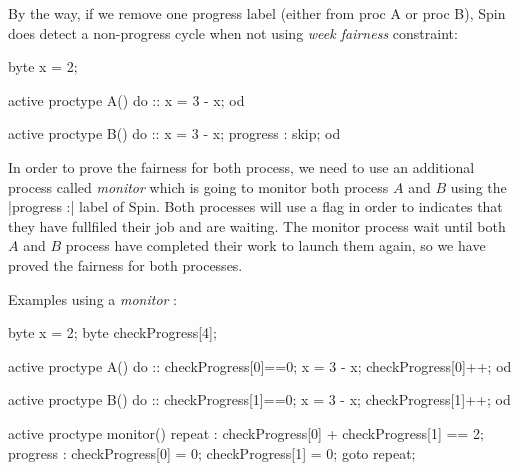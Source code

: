\documentclass[a4paper,11pt]{report}
\begin{document}
By the way, if we remove one progress label (either from proc A or proc
B), Spin does detect a non-progress cycle when not using \textit{week fairness}
constraint:

\begin{listing}[H]
\centering
\begin{promelacode}
byte x = 2;

active proctype A(){
    do :: x = 3 - x; od
}

active proctype B(){
    do :: x = 3 - x; progress : skip; od
}
\end{promelacode}
\end{listing}

In order to prove the fairness for both process, we need to use an additional
process called \textit{monitor} which is going to monitor both process $A$
and $B$ using the \promelainline|progress :| label of Spin. Both processes will
use a flag in order to indicates that they have fullfiled their job and are
waiting. The monitor process wait until both $A$ and $B$ process have completed
their work to launch them again, so we have proved the fairness for both processes.

Examples using a \textit{monitor} :

\begin{listing}[H]
\centering
\begin{promelacode}
byte x = 2;
byte checkProgress[4];

active proctype A(){
       do ::
           checkProgress[0]==0;
           x = 3 - x;
           checkProgress[0]++;
       od
}

active proctype B(){
       do ::
           checkProgress[1]==0;
           x = 3 - x;
           checkProgress[1]++;
       od
}

active proctype monitor(){
       repeat :
       checkProgress[0] + checkProgress[1] == 2;
       progress :
       checkProgress[0] = 0;
       checkProgress[1] = 0;
       goto repeat;
}
\end{promelacode}
\end{listing}
\end{document}
